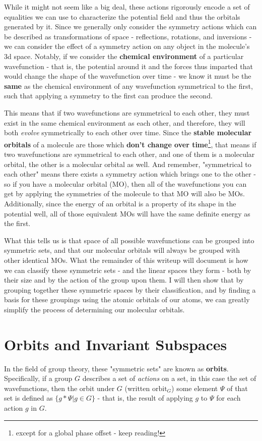 \documentclass{article}
\begin{document}
While it might not seem like a big deal, these actions rigorously encode a set of equalities we can use to characterize the potential field and thus the orbitals generated by it. Since we generally only consider the symmetry actions which can be described as transformations of space - reflections, rotations, and inversions - we can consider the effect of a symmetry action on any object in the molecule's 3d space. Notably, if we consider the \textbf{chemical environment} of a particular wavefunction - that is, the potential around it and the forces thus imparted that would change the shape of the wavefunction over time - we know it must be the \textbf{same} as the chemical environment of any wavefunction symmetrical to the first, such that applying a symmetry to the first can produce the second. 

This means that if two wavefunctions are symmetrical to each other, they must exist in the same chemical environment as each other, and therefore, they will both \textit{evolve} symmetrically to each other over time. Since the \textbf{stable molecular orbitals} of a molecule are those which \textbf{don't change over time}\footnote{except for a global phase offset - keep reading!}, that means if two wavefunctions are symmetrical to each other, and one of them is a molecular orbital, the other is a molecular orbital as well. And remember, "symmetrical to each other" means there exists a symmetry action which brings one to the other - so if you have a molecular orbital (MO), then all of the wavefunctions you can get by applying the symmetries of the molecule to that MO will also be MOs. Additionally, since the energy of an orbital is a property of its shape in the potential well, all of those equivalent MOs will have the same definite energy as the first. 

What this tells us is that space of all possible wavefunctions can be grouped into symmetric sets, and that our molecular orbitals will always be grouped with other identical MOs. What the remainder of this writeup will document is how we can classify these symmetric sets - and the linear spaces they form - both by their size and by the action of the group upon them. I will then show that by grouping together these symmetric spaces by their classification, and by finding a basis for these groupings using the atomic orbitals of our atoms, we can greatly simplify the process of determining our molecular orbitals.



\section{Orbits and Invariant Subspaces}
In the field of group theory, these "symmetric sets" are known as \textbf{orbits}. Specifically, if a group $G$ describes a set of \textit{actions} on a set, in this case the set of wavefunctions, then the orbit under $G$ (written $\text{orbit}_G$) some element $\Psi$ of that set is defined as $\{g * \Psi | g \in G\}$ - that is, the result of applying $g$ to $\Psi$ for each action $g$ in $G$.
\end{document}
